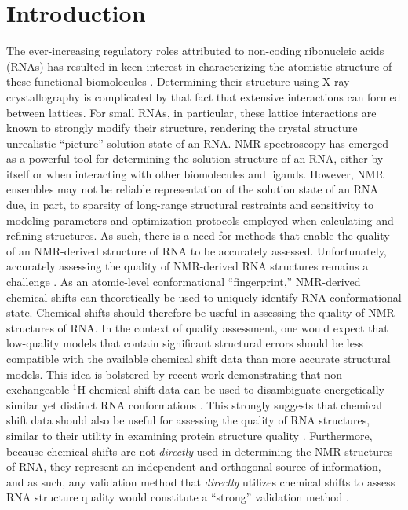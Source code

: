 \documentclass[fleqn,10pt]{wlscirep}
\begin{document}
\section*{Introduction}
The ever-increasing regulatory roles attributed to non-coding ribonucleic acids (RNAs) has resulted in keen interest in characterizing the atomistic structure of these functional biomolecules \cite{storz2002expanding}. Determining their structure using X-ray crystallography is complicated by that fact that extensive interactions can formed between lattices. For small RNAs, in particular, these lattice interactions are known to strongly modify their structure, rendering the crystal structure  unrealistic ``picture''  solution state of an RNA. NMR spectroscopy has emerged as a powerful tool for determining the solution structure of an RNA, either by itself or when interacting with other biomolecules and ligands. However, NMR ensembles may not be reliable representation of the solution state of an RNA due, in part, to sparsity of long-range structural restraints and sensitivity to modeling parameters and optimization protocols  employed when calculating and refining structures. As such, there is a need for methods that enable the quality of an NMR-derived structure of RNA to be accurately assessed. Unfortunately, accurately assessing the quality of NMR-derived RNA structures remains a challenge \cite{montelione2013recommendations}. As an atomic-level conformational ``fingerprint,'' NMR-derived chemical shifts can theoretically be used to uniquely identify RNA conformational state. Chemical shifts should therefore be useful in assessing the quality of NMR structures of RNA. In the context of quality assessment, one would expect that low-quality models that contain significant structural errors should be less compatible with the available chemical shift data than more accurate structural models. This idea is bolstered by recent work demonstrating that non-exchangeable $^{1}$H chemical shift data can be used to disambiguate energetically similar yet distinct RNA conformations \cite{sripakdeevong2014structure}. This strongly suggests that chemical shift data should also be useful for assessing the quality of RNA structures, similar to their utility in examining protein structure quality \cite{vila2009assessing, sahakyan2011using, sahakyan2012protein, martin2013physics, zhu2014correction}. Furthermore, because chemical shifts are not \textit{directly} used in determining the NMR structures of RNA, they represent an independent and orthogonal source of information, and as such, any validation method that \textit{directly} utilizes chemical shifts to assess RNA structure quality would constitute a ``strong'' validation method \cite{vila2009assessing}. 
\end{document}
